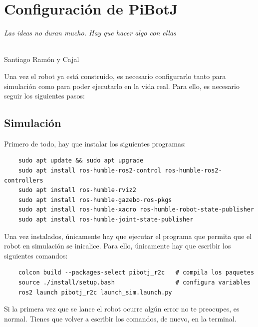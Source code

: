 \chapter{Configuración de PiBotJ}
\label{cap:capitulo9}

\begin{flushright}
\begin{minipage}[]{10cm}
\emph{Las ideas no duran mucho. Hay que hacer algo con ellas}\\
\end{minipage}\\

Santiago Ramón y Cajal\\
\end{flushright}

\vspace{1cm}

Una vez el robot ya está construido, es necesario configurarlo tanto para simulación como para poder ejecutarlo en la vida real. Para ello, es necesario seguir los siguientes pasos: 

\section{Simulación}
\label{subsec:anexosimulacion}

Primero de todo, hay que instalar los siguientes programas: 

\begin{verbatim}
	sudo apt update && sudo apt upgrade
	sudo apt install ros-humble-ros2-control ros-humble-ros2-controllers
	sudo apt install ros-humble-rviz2
	sudo apt install ros-humble-gazebo-ros-pkgs
	sudo apt install ros-humble-xacro ros-humble-robot-state-publisher 
	sudo apt install ros-humble-joint-state-publisher
\end{verbatim}
 
Una vez instalados, únicamente hay que ejecutar el programa que permita que el robot en simulación se inicalice. Para ello, únicamente hay que escribir los siguientes comandos:
\begin{verbatim}
	colcon build --packages-select pibotj_r2c   # compila los paquetes
	source ./install/setup.bash                 # configura variables 
	ros2 launch pibotj_r2c launch_sim.launch.py
\end{verbatim} 

Si la primera vez que se lance el robot ocurre algún error no te preocupes, es normal. Tienes que volver a escribir los comandos, de nuevo, en la terminal.

